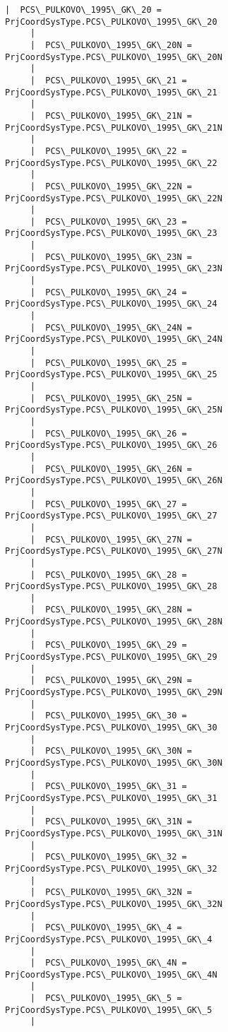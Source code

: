 \documentclass[11pt]{article}
\begin{document}
\begin{Verbatim}[commandchars=\\\{\}]
     |  PCS\_PULKOVO\_1995\_GK\_20 = PrjCoordSysType.PCS\_PULKOVO\_1995\_GK\_20
     |  
     |  PCS\_PULKOVO\_1995\_GK\_20N = PrjCoordSysType.PCS\_PULKOVO\_1995\_GK\_20N
     |  
     |  PCS\_PULKOVO\_1995\_GK\_21 = PrjCoordSysType.PCS\_PULKOVO\_1995\_GK\_21
     |  
     |  PCS\_PULKOVO\_1995\_GK\_21N = PrjCoordSysType.PCS\_PULKOVO\_1995\_GK\_21N
     |  
     |  PCS\_PULKOVO\_1995\_GK\_22 = PrjCoordSysType.PCS\_PULKOVO\_1995\_GK\_22
     |  
     |  PCS\_PULKOVO\_1995\_GK\_22N = PrjCoordSysType.PCS\_PULKOVO\_1995\_GK\_22N
     |  
     |  PCS\_PULKOVO\_1995\_GK\_23 = PrjCoordSysType.PCS\_PULKOVO\_1995\_GK\_23
     |  
     |  PCS\_PULKOVO\_1995\_GK\_23N = PrjCoordSysType.PCS\_PULKOVO\_1995\_GK\_23N
     |  
     |  PCS\_PULKOVO\_1995\_GK\_24 = PrjCoordSysType.PCS\_PULKOVO\_1995\_GK\_24
     |  
     |  PCS\_PULKOVO\_1995\_GK\_24N = PrjCoordSysType.PCS\_PULKOVO\_1995\_GK\_24N
     |  
     |  PCS\_PULKOVO\_1995\_GK\_25 = PrjCoordSysType.PCS\_PULKOVO\_1995\_GK\_25
     |  
     |  PCS\_PULKOVO\_1995\_GK\_25N = PrjCoordSysType.PCS\_PULKOVO\_1995\_GK\_25N
     |  
     |  PCS\_PULKOVO\_1995\_GK\_26 = PrjCoordSysType.PCS\_PULKOVO\_1995\_GK\_26
     |  
     |  PCS\_PULKOVO\_1995\_GK\_26N = PrjCoordSysType.PCS\_PULKOVO\_1995\_GK\_26N
     |  
     |  PCS\_PULKOVO\_1995\_GK\_27 = PrjCoordSysType.PCS\_PULKOVO\_1995\_GK\_27
     |  
     |  PCS\_PULKOVO\_1995\_GK\_27N = PrjCoordSysType.PCS\_PULKOVO\_1995\_GK\_27N
     |  
     |  PCS\_PULKOVO\_1995\_GK\_28 = PrjCoordSysType.PCS\_PULKOVO\_1995\_GK\_28
     |  
     |  PCS\_PULKOVO\_1995\_GK\_28N = PrjCoordSysType.PCS\_PULKOVO\_1995\_GK\_28N
     |  
     |  PCS\_PULKOVO\_1995\_GK\_29 = PrjCoordSysType.PCS\_PULKOVO\_1995\_GK\_29
     |  
     |  PCS\_PULKOVO\_1995\_GK\_29N = PrjCoordSysType.PCS\_PULKOVO\_1995\_GK\_29N
     |  
     |  PCS\_PULKOVO\_1995\_GK\_30 = PrjCoordSysType.PCS\_PULKOVO\_1995\_GK\_30
     |  
     |  PCS\_PULKOVO\_1995\_GK\_30N = PrjCoordSysType.PCS\_PULKOVO\_1995\_GK\_30N
     |  
     |  PCS\_PULKOVO\_1995\_GK\_31 = PrjCoordSysType.PCS\_PULKOVO\_1995\_GK\_31
     |  
     |  PCS\_PULKOVO\_1995\_GK\_31N = PrjCoordSysType.PCS\_PULKOVO\_1995\_GK\_31N
     |  
     |  PCS\_PULKOVO\_1995\_GK\_32 = PrjCoordSysType.PCS\_PULKOVO\_1995\_GK\_32
     |  
     |  PCS\_PULKOVO\_1995\_GK\_32N = PrjCoordSysType.PCS\_PULKOVO\_1995\_GK\_32N
     |  
     |  PCS\_PULKOVO\_1995\_GK\_4 = PrjCoordSysType.PCS\_PULKOVO\_1995\_GK\_4
     |  
     |  PCS\_PULKOVO\_1995\_GK\_4N = PrjCoordSysType.PCS\_PULKOVO\_1995\_GK\_4N
     |  
     |  PCS\_PULKOVO\_1995\_GK\_5 = PrjCoordSysType.PCS\_PULKOVO\_1995\_GK\_5
     |  

\end{Verbatim}
\end{document}
